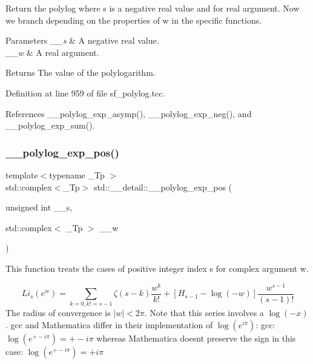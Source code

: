 Return the polylog where s is a negative real value and for real argument. Now we branch depending on the properties of w in the specific functions.


\begin{DoxyParams}{Parameters}
{\em \+\_\+\+\_\+s} & A negative real value. \\
\hline
{\em \+\_\+\+\_\+w} & A real argument. \\
\hline
\end{DoxyParams}
\begin{DoxyReturn}{Returns}
The value of the polylogarithm. 
\end{DoxyReturn}


Definition at line 959 of file sf\+\_\+polylog.\+tcc.



References \+\_\+\+\_\+polylog\+\_\+exp\+\_\+asymp(), \+\_\+\+\_\+polylog\+\_\+exp\+\_\+neg(), and \+\_\+\+\_\+polylog\+\_\+exp\+\_\+sum().

\mbox{\label{namespacestd_1_1____detail_a0327d2970eba3a0a2d73c71c7a77701c}} 
\subsubsection{\texorpdfstring{\+\_\+\+\_\+polylog\+\_\+exp\+\_\+pos()}{\_\_polylog\_exp\_pos()}\hspace{0.1cm}{\footnotesize\ttfamily [1/3]}}
{\footnotesize\ttfamily template$<$typename \+\_\+\+Tp $>$ \\
std\+::complex$<$\+\_\+\+Tp$>$ std\+::\+\_\+\+\_\+detail\+::\+\_\+\+\_\+polylog\+\_\+exp\+\_\+pos (\begin{DoxyParamCaption}\item[{unsigned int}]{\+\_\+\+\_\+s,  }\item[{std\+::complex$<$ \+\_\+\+Tp $>$}]{\+\_\+\+\_\+w }\end{DoxyParamCaption})}

This function treats the cases of positive integer index s for complex argument w.

\[ Li_s(e^w) = \sum_{k=0, k != s-1} \zeta(s-k) \frac{w^k}{k!} + \left[H_{s-1} - \log(-w)\right] \frac{w^{s-1}}{(s-1)!} \] The radius of convergence is $ |w| < 2 \pi $. Note that this series involves a $ \log(-x) $. gcc and Mathematica differ in their implementation of $ \log(e^{i\pi}) $\+: gcc\+: $ \log(e^{+-i\pi}) = +-i\pi $ whereas Mathematica doesn\textquotesingle{}t preserve the sign in this case\+: $ \log(e^{+- i\pi}) = +i \pi $



